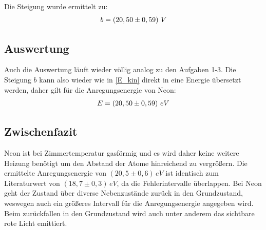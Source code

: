 \begin{center}
\begin{minipage}{\linewidth}
\centering
{}
\label{graph_a3}
\end{minipage}
\end{center}
Die Steigung wurde ermittelt zu:
\begin{align}
b = \left( 20,50 \pm 0,59 \right)\, V \notag
\end{align}
\subsection{Auswertung}
Auch die Auswertung läuft wieder völlig analog zu den Aufgaben 1-3.
Die Steigung \(b\) kann also wieder wie in \eqref{E_kin} direkt in eine Energie übersetzt werden, daher gilt für die Anregungsenergie von Neon:
\begin{align}
E = \left( 20,50 \pm 0,59 \right)\, eV \notag
\end{align}
\subsection{Zwischenfazit}
Neon ist bei Zimmertemperatur gasförmig und es wird daher keine weitere Heizung benötigt um den Abstand der Atome hinreichend zu vergrößern. Die ermittelte Anregungsenergie von \(\left( 20,5 \pm 0,6\right)\, eV \) ist identisch zum Literaturwert von \(\left( 18,7 \pm 0,3\right)\, eV \), da die Fehlerintervalle überlappen. Bei Neon geht der Zustand über diverse Nebenzustände zurück in den Grundzustand, weswegen auch ein größeres Intervall für die Anregungsenergie angegeben wird. Beim zurückfallen in den Grundzustand wird auch unter anderem das sichtbare rote Licht emittiert.